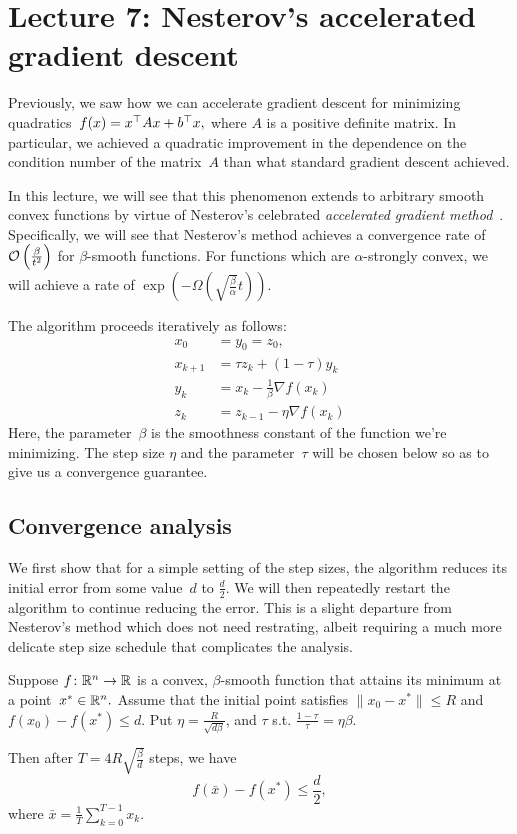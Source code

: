\section{Lecture 7: Nesterov’s accelerated gradient descent}

Previously, we saw how we can accelerate gradient descent for minimizing
quadratics~$f(x)=x^\top A x+b^\top x,$ where $A$ is a positive definite
matrix. In particular, we achieved a quadratic improvement in the dependence
on the condition number of the matrix~$A$ than what standard gradient descent
achieved.

In this lecture, we will see that this phenomenon extends to arbitrary smooth
convex functions by virtue of Nesterov's celebrated \emph{accelerated gradient
method}~\cite{Nesterov83, Nesterov04}. Specifically, we will see that Nesterov's
method achieves a convergence rate of~${\cal O} \left(\frac{\beta}{t^2}\right)$ for
$\beta$-smooth functions. For functions which are $\alpha$-strongly convex, we
will achieve a rate of $\exp\left( -\Omega\left(\sqrt{\frac{\beta}{\alpha}}
t\right)\right)$. 

The algorithm proceeds iteratively as follows: 
\begin{align*}
x_0 &= y_0 = z_0, \\
x_{k+1} &= \tau z_k + (1 - \tau) y_k \tag{$k\ge 0$}\\
y_k &= x_k - \frac{1}{\beta} \nabla f(x_k) \tag{$k\ge 1$}\\
z_k &= z_{k -1} - \eta\nabla f(x_k)\tag{$k\ge 1$}
\end{align*}
Here, the parameter~$\beta$ is the smoothness constant of the function we're
minimizing. The step size $\eta$ and the parameter~$\tau$ will be chosen below
so as to give us a convergence guarantee.

\subsection{Convergence analysis}

We first show that for a simple setting of the step sizes, the algorithm reduces
its initial error from some value~$d$ to $\frac{d}{2}.$ We will then repeatedly
restart the algorithm to continue reducing the error. This is a slight departure
from Nesterov's method which does not need restrating, albeit requiring a much
more delicate step size schedule that complicates the analysis.

\begin{lemma}
Suppose $f\colon\mathbb{R}^n\to\mathbb{R}$ is a convex, $\beta$-smooth function that attains its
minimum at a point~$x^*\in\mathbb{R}^n.$
Assume that the initial point satisfies $\|x_0-x^*\|\le R$ and $f(x_0)-f(x^*)\le
d.$ Put $\eta = \frac{R}{\sqrt{d\beta}}$, and 
$\tau$ s.t. $\frac{1-\tau}{\tau} = \eta \beta$.

Then after $T = 4R\sqrt{\frac{\beta}{d}}$ steps, 
we have 
\[
f(\bar{x})- f(x^*) \leq \frac{d}{2},
\]
where $\bar{x} = \frac{1}{T} \sum_{k=0}^{T-1} x_k$.
\end{lemma}

